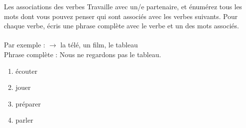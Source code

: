 \begin{frame}{Les associations des verbes }
  Travaille avec un/e partenaire, et énumérez tous les mots dont vous pouvez penser qui sont associés avec les verbes suivants.
  Pour chaque verbe, écris une phrase complète avec le verbe et \alert{un} des mots associés. \\
   \\
  Par exemple :  $\to$ la télé, un film, le tableau \\
  Phrase complète : Nous ne regardons pas le tableau.
  \begin{enumerate}
    \item écouter
    \item jouer
    \item préparer
    \item parler
  \end{enumerate}
\end{frame}
